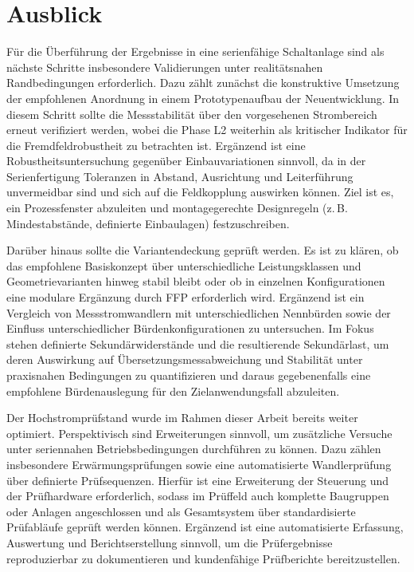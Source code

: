 \section{Ausblick}
\label{chap:ausblick}

Für die Überführung der Ergebnisse in eine serienfähige Schaltanlage sind als nächste Schritte insbesondere Validierungen unter realitätsnahen Randbedingungen erforderlich. Dazu zählt zunächst die konstruktive Umsetzung der empfohlenen Anordnung in einem Prototypenaufbau der Neuentwicklung. In diesem Schritt sollte die Messstabilität über den vorgesehenen Strombereich erneut verifiziert werden, wobei die Phase L2 weiterhin als kritischer Indikator für die Fremdfeldrobustheit zu betrachten ist. Ergänzend ist eine Robustheitsuntersuchung gegenüber Einbauvariationen sinnvoll, da in der Serienfertigung Toleranzen in Abstand, Ausrichtung und Leiterführung unvermeidbar sind und sich auf die Feldkopplung auswirken können. Ziel ist es, ein Prozessfenster abzuleiten und montagegerechte Designregeln (z.\,B. Mindestabstände, definierte Einbaulagen) festzuschreiben.

Darüber hinaus sollte die Variantendeckung geprüft werden. Es ist zu klären, ob das empfohlene Basiskonzept über unterschiedliche Leistungsklassen und Geometrievarianten hinweg stabil bleibt oder ob in einzelnen Konfigurationen eine modulare Ergänzung durch FFP erforderlich wird. Ergänzend ist ein Vergleich von Messstromwandlern mit unterschiedlichen Nennbürden sowie der Einfluss unterschiedlicher Bürdenkonfigurationen zu untersuchen. Im Fokus stehen definierte Sekundärwiderstände und die resultierende Sekundärlast, um deren Auswirkung auf Übersetzungsmessabweichung und Stabilität unter praxisnahen Bedingungen zu quantifizieren und daraus gegebenenfalls eine empfohlene Bürdenauslegung für den Zielanwendungsfall abzuleiten.



Der Hochstromprüfstand wurde im Rahmen dieser Arbeit bereits weiter optimiert. Perspektivisch sind Erweiterungen sinnvoll, um zusätzliche Versuche unter seriennahen Betriebsbedingungen durchführen zu können. Dazu zählen insbesondere Erwärmungsprüfungen sowie eine automatisierte Wandlerprüfung über definierte Prüfsequenzen. Hierfür ist eine Erweiterung der Steuerung und der Prüfhardware erforderlich, sodass im Prüffeld auch komplette Baugruppen oder Anlagen angeschlossen und als Gesamtsystem über standardisierte Prüfabläufe geprüft werden können. Ergänzend ist eine automatisierte Erfassung, Auswertung und Berichtserstellung sinnvoll, um die Prüfergebnisse reproduzierbar zu dokumentieren und kundenfähige Prüfberichte bereitzustellen.
